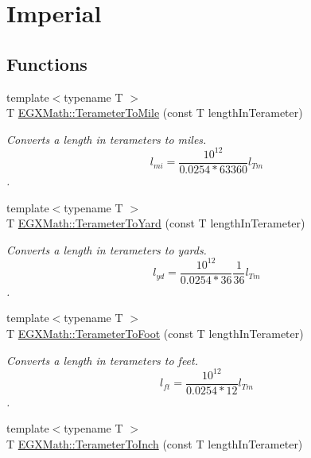 \hypertarget{group___e_g_x_math-_conversions-_length_conversions-_terameter-_imperial}{}\section{Imperial}
\label{group___e_g_x_math-_conversions-_length_conversions-_terameter-_imperial}
\subsection*{Functions}
\begin{DoxyCompactItemize}
\item 
{\footnotesize template$<$typename T $>$ }\\T \mbox{\hyperlink{group___e_g_x_math-_conversions-_length_conversions-_terameter-_imperial_ga51468f3ffd5925fb2cbb188d49b6aa60}{E\+G\+X\+Math\+::\+Terameter\+To\+Mile}} (const T length\+In\+Terameter)
\begin{DoxyCompactList}\small\item\em Converts a length in terameters to miles. \[ l_{mi}=\frac{10^{12}}{0.0254 * 63360} l_{Tm} \]. \end{DoxyCompactList}\item 
{\footnotesize template$<$typename T $>$ }\\T \mbox{\hyperlink{group___e_g_x_math-_conversions-_length_conversions-_terameter-_imperial_ga4f3bcac82e02fddb21fedf80ec01275b}{E\+G\+X\+Math\+::\+Terameter\+To\+Yard}} (const T length\+In\+Terameter)
\begin{DoxyCompactList}\small\item\em Converts a length in terameters to yards. \[ l_{yd}= \frac{10^{12}}{0.0254 * 36} \frac{1}{36} l_{Tm} \]. \end{DoxyCompactList}\item 
{\footnotesize template$<$typename T $>$ }\\T \mbox{\hyperlink{group___e_g_x_math-_conversions-_length_conversions-_terameter-_imperial_gaf903b744223a3acb964367da6f14b96f}{E\+G\+X\+Math\+::\+Terameter\+To\+Foot}} (const T length\+In\+Terameter)
\begin{DoxyCompactList}\small\item\em Converts a length in terameters to feet. \[ l_{ft}= \frac{10^{12}}{0.0254 * 12} l_{Tm} \]. \end{DoxyCompactList}\item 
{\footnotesize template$<$typename T $>$ }\\T \mbox{\hyperlink{group___e_g_x_math-_conversions-_length_conversions-_terameter-_imperial_ga85c9ddc82ba02c1fea0b22b896fed936}{E\+G\+X\+Math\+::\+Terameter\+To\+Inch}} (const T length\+In\+Terameter)

\end{DoxyCompactItemize}
